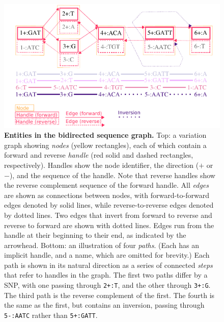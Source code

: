 \documentclass{article}
\begin{document}
\FloatBarrier

\begin{figure}
	\begin{center}
		\includegraphics[width=1.0\textwidth]{figures/GRaphchrXpaper.pdf}
	\end{center}
	\caption{{\label{fig:graph}
        \textbf{Entities in the bidirected sequence graph.}
        Top: a variation graph showing \emph{nodes} (yellow rectangles), each of which contain a forward and reverse \emph{handle} (red solid and dashed rectangles, respectively).
        Handles show the node identifier, the direction ($+$ or $-$), and the sequence of the handle.
        Note that reverse handles show the reverse complement sequence of the forward handle.
        All \emph{edges} are shown as connections between nodes, with forward-to-forward edges denoted by solid lines, while reverse-to-reverse edges denoted by dotted lines.
        Two edges that invert from forward to reverse and reverse to forward are shown with dotted lines.
        Edges run from the handle at their beginning to their end, as indicated by the arrowhead.
        Bottom: an illustration of four \emph{paths}.
        (Each has an implicit handle, and a name, which are omitted for brevity.)
        Each path is shown in its natural direction as a series of connected \emph{steps} that refer to handles in the graph.
        The first two paths differ by a SNP, with one passing through \texttt{2+:T}, and the other through \texttt{3+:G}.
        The third path is the reverse complement of the first.
        The fourth is the same as the first, but contains an inversion, passing through \texttt{5-:AATC} rather than \texttt{5+:GATT}.
      }
    }
\end{figure}
\end{document}
